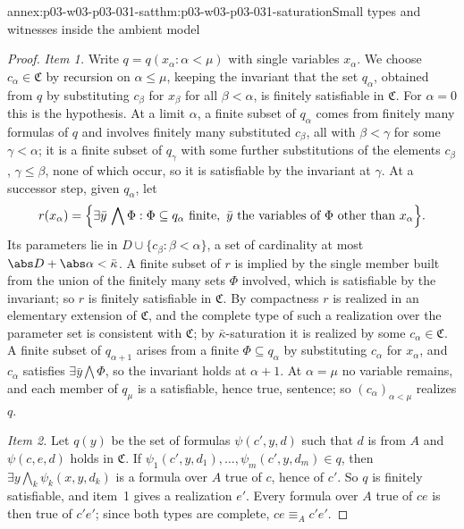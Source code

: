 \begin{annexitem}{annex:p03-w03-p03-031-sat}{thm:p03-w03-p03-031-saturation}{Small types and witnesses inside the ambient model}
\begin{proof}
\emph{Item 1.}  Write \(q=q(x_\alpha:\alpha<\mu)\) with single variables
\(x_\alpha\).  We choose \(c_\alpha\in\mathfrak C\) by recursion on
\(\alpha\leq\mu\), keeping the invariant that the set \(q_\alpha\),
obtained from \(q\) by substituting \(c_\beta\) for \(x_\beta\) for all
\(\beta<\alpha\), is finitely satisfiable in \(\mathfrak C\).  For
\(\alpha=0\) this is the hypothesis.  At a limit \(\alpha\), a finite
subset of \(q_\alpha\) comes from finitely many formulas of \(q\) and
involves finitely many substituted \(c_\beta\), all with \(\beta<\gamma\)
for some \(\gamma<\alpha\); it is a finite subset of \(q_\gamma\) with some
further substitutions of the elements \(c_\beta\), \(\gamma\leq\beta\),
none of which occur, so it is satisfiable by the invariant at \(\gamma\).
At a successor step, given \(q_\alpha\), let
\[
 r(x_\alpha)=\Bigl\{\exists\bar y\,\bigwedge\Phi:\Phi\subseteq q_\alpha
   \text{ finite},\ \bar y\text{ the variables of }\Phi\text{ other than }
   x_\alpha\Bigr\}.
\]
Its parameters lie in \(D\cup\{c_\beta:\beta<\alpha\}\), a set of
cardinality at most \(\abs D+\abs\alpha<\bar\kappa\).  A finite subset of
\(r\) is implied by the single member built from the union of the finitely
many sets \(\Phi\) involved, which is satisfiable by the invariant; so
\(r\) is finitely satisfiable in \(\mathfrak C\).  By compactness \(r\) is
realized in an elementary extension of \(\mathfrak C\), and the complete
type of such a realization over the parameter set is consistent with
\(\mathfrak C\); by \(\bar\kappa\)-saturation
it is realized by some \(c_\alpha\in\mathfrak C\).  A finite subset of
\(q_{\alpha+1}\) arises from a finite \(\Phi\subseteq q_\alpha\) by
substituting \(c_\alpha\) for \(x_\alpha\), and \(c_\alpha\) satisfies
\(\exists\bar y\bigwedge\Phi\), so the invariant holds at \(\alpha+1\).  At
\(\alpha=\mu\) no variable remains, and each member of \(q_\mu\) is a
satisfiable, hence true, sentence; so \((c_\alpha)_{\alpha<\mu}\)
realizes \(q\).

\emph{Item 2.}  Let \(q(y)\) be the set of formulas \(\psi(c',y,d)\) such
that \(d\) is from \(A\) and \(\psi(c,e,d)\) holds in \(\mathfrak C\).  If
\(\psi_1(c',y,d_1),\ldots,\psi_m(c',y,d_m)\in q\), then
\(\exists y\bigwedge_k\psi_k(x,y,d_k)\) is a formula over \(A\) true of
\(c\), hence of \(c'\).  So \(q\) is finitely satisfiable, and item~1
gives a realization \(e'\).  Every formula over \(A\) true of \(ce\) is then
true of \(c'e'\); since both types are complete, \(ce\equiv_Ac'e'\).


\end{proof}
\end{annexitem}
